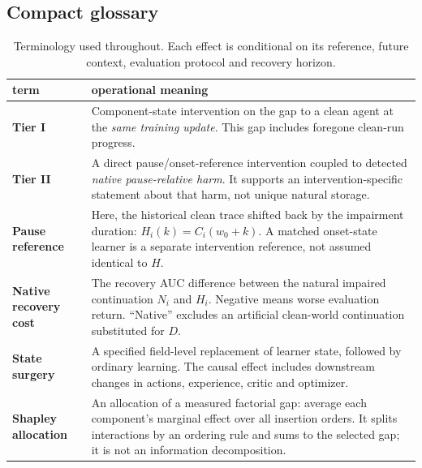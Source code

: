 \documentclass[10pt]{article}
\begin{document}
\subsection{Compact glossary}
\begin{table}[ht]
\centering
\caption{Terminology used throughout. Each effect is conditional on its reference, future context, evaluation protocol and recovery horizon.}
\label{m:glossary}
\small
\begin{tabularx}{\linewidth}{@{}>{\raggedright\arraybackslash}p{3.2cm}X@{}}
\toprule
term & operational meaning \\
\midrule
\textbf{Tier I} & Component-state intervention on the gap to a clean agent at the \emph{same training update}. This gap includes foregone clean-run progress. \\
\addlinespace
\textbf{Tier II} & A direct pause/onset-reference intervention coupled to detected \emph{native pause-relative harm}. It supports an intervention-specific statement about that harm, not unique natural storage. \\
\addlinespace
\textbf{Pause reference} & Here, the historical clean trace shifted back by the impairment duration: $H_i(k)=C_i(w_0+k)$. A matched onset-state learner is a separate intervention reference, not assumed identical to $H$. \\
\addlinespace
\textbf{Native recovery cost} & The recovery AUC difference between the natural impaired continuation $N_i$ and $H_i$. Negative means worse evaluation return. ``Native'' excludes an artificial clean-world continuation substituted for $D$. \\
\addlinespace
\textbf{State surgery} & A specified field-level replacement of learner state, followed by ordinary learning. The causal effect includes downstream changes in actions, experience, critic and optimizer. \\
\addlinespace
\textbf{Shapley allocation} & An allocation of a measured factorial gap: average each component's marginal effect over all insertion orders. It splits interactions by an ordering rule and sums to the selected gap; it is not an information decomposition. \\
\bottomrule
\end{tabularx}
\end{table}


\clearpage
\end{document}
